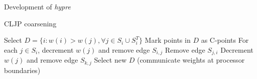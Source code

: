 \documentclass[18pt,xcolor=table]{beamer}
\begin{document}
\begin{frame}{Development of \emph{hypre}}
\begin{algorithm}[H]
\caption{CLJP coarsening}
\begin{algorithmic}
\State Select $D = \{i : w(i)>w(j) , \forall j\in S_i\cup S_i^T\}$
\State Mark points in $D$ as C-points
   \State For each $j\in S_i$, decrement $w(j)$ and remove edge $S_{i,j}$
      \State Remove edge $S_{j,i}$
         \State Decrement $w(j)$ and remove edge $S_{k,j}$
      \EndFor
   \EndFor
\EndFor
\State Select new $D$ (communicate weights at processor boundaries)
\EndWhile
\end{algorithmic}
\end{algorithm}
\end{frame}
\end{document}
